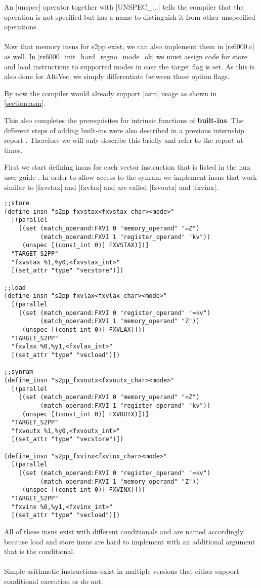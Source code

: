 An |unspec| operator together with |UNSPEC_...| tells the compiler that the operation is not specified but has a name to distinguish it from other unspecified operations.
\\
\\
Now that memory insns for s2pp exist, we can also implement them in |rs6000.c| as well.
In |rs6000_init_hard_regno_mode_ok| we must assign code for store and load instructions to supported modes in case the target flag is set.
As this is also done for AltiVec, we simply differentiate between those option flags.

By now the compiler would already support |asm| usage as shown in \ref{section:asm}.

This also completes the prerequisites for intrinsic functions of \textbf{built-ins}.
The different steps of adding built-ins were also described in a previous internship report \citep{heimbrecht_2017internship}.
Therefore we will only describe this briefly and refer to the report at times.

First we start defining insns for each vector instruction that is listed in the nux user guide \citep{nuxmanual}.
In order to allow access to the synram we implement insns that work similar to |fxvstax| and |fxvlax| and are called |fxvoutx| and |fxvinx|.
\begin{lstlisting}
;;store
(define_insn "s2pp_fxvstax<fxvstax_char><mode>"
  [(parallel
    [(set (match_operand:FXVI 0 "memory_operand" "=Z")
          (match_operand:FXVI 1 "register_operand" "kv"))
     (unspec [(const_int 0)] FXVSTAX)])]
  "TARGET_S2PP"
  "fxvstax %1,%y0,<fxvstax_int>"
  [(set_attr "type" "vecstore")])

;;load
(define_insn "s2pp_fxvlax<fxvlax_char><mode>"
  [(parallel
    [(set (match_operand:FXVI 0 "register_operand" "=kv")
          (match_operand:FXVI 1 "memory_operand" "Z"))
     (unspec [(const_int 0)] FXVLAX)])]
  "TARGET_S2PP"
  "fxvlax %0,%y1,<fxvlax_int>"
  [(set_attr "type" "vecload")])

;;synram
(define_insn "s2pp_fxvoutx<fxvoutx_char><mode>"
  [(parallel
    [(set (match_operand:FXVI 0 "memory_operand" "=Z")
          (match_operand:FXVI 1 "register_operand" "kv"))
     (unspec [(const_int 0)] FXVOUTX)])]
  "TARGET_S2PP"
  "fxvoutx %1,%y0,<fxvoutx_int>"
  [(set_attr "type" "vecstore")])

(define_insn "s2pp_fxvinx<fxvinx_char><mode>"
  [(parallel
    [(set (match_operand:FXVI 0 "register_operand" "=kv")
          (match_operand:FXVI 1 "memory_operand" "Z"))
     (unspec [(const_int 0)] FXVINX)])]
  "TARGET_S2PP"
  "fxvinx %0,%y1,<fxvinx_int>"
  [(set_attr "type" "vecload")])
\end{lstlisting}
All of these insns exist with different conditionals and are named accordingly because load and store insns are hard to implement with an additional argument that is the conditional.
\\
\\
Simple arithmetic instructions exist in multiple versions that either support conditional execution or do not.

